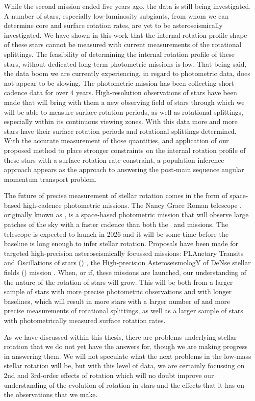 While the second \kepler{} mission ended five years ago, the data is still being investigated.
A number of stars, especially low-luminosity subgiants, from whom we can determine core and surface rotation rates, are yet to be asteroseismically investigated.
We have shown in this work that the internal rotation profile shape of these stars cannot be measured with current measurements of the rotational splittings.
The feasibility of determining the internal rotation profile of these stars, without dedicated long-term photometric missions is low.
That being said, the data boom we are currently experiencing, in regard to photometric data, does not appear to be slowing.
The \tess{} photometric mission has been collecting short cadence data for over 4 years.
High-resolution observations of stars have been made that will bring with them a new observing field of stars through which we will be able to measure surface rotation periods, as well as rotational splittings, especially within its continuous viewing zones.
With this data more and more stars have their surface rotation periods \citep{claytor_tess_2023} and rotational splittings determined.
With the accurate measurement of those quantities, and application of our proposed method to place stronger constraints on the internal rotation profile of these stars with a surface rotation rate constraint, a population inference approach appears as the approach to answering the post-main sequence angular momentum transport problem.

The future of precise measurement of stellar rotation comes in the form of space-based high-cadence photometric missions.
The Nancy Grace Roman telescope \citep{akeson_wide_2019}, originally known as \wfirst, is a space-based photometric mission that will observe large patches of the sky with a faster cadence than both the \kepler\ and \tess{} missions.
The telescope is expected to launch in 2026 and it will be some time before the baseline is long enough to infer stellar rotation.
Proposals have been made for targeted high-precision asteroseismically focussed missions: PLAnetary Transits and Oscillations of stars (\plato) \citep{rauer_plato_2014}, the High-precision AsteroseismologY of DeNse stellar fields (\haydn) mission \citep{miglio_haydn_2021}.
When, or if, these missions are launched, our understanding of the nature of the rotation of stars will grow.
This will be both from a larger sample of stars with more precise photometric observations and with longer baselines, which will result in more stars with a larger number of and more precise measurements of rotational splittings, as well as a larger sample of stars with photometrically measured surface rotation rates.

As we have discussed within this thesis, there are problems underlying stellar rotation that we do not yet have the answers for, though we are making progress in answering them.
We will not speculate what the next problems in the low-mass stellar rotation will be, but with this level of data, we are certainly focussing on 2nd and 3rd-order effects of rotation which will no doubt improve our understanding of the evolution of rotation in stars and the effects that it has on the observations that we make.
